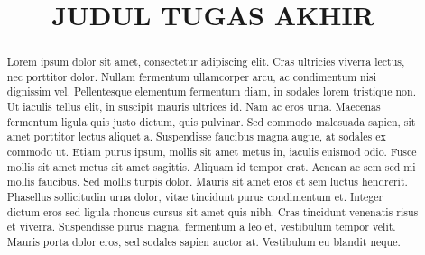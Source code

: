 \documentclass[conference,a4paper,10pt]{IEEEtran}
\begin{document}

\title{JUDUL TUGAS AKHIR}

\author{
    \and
    \and
}

\maketitle

\begin{abstract}
Lorem ipsum dolor sit amet, consectetur adipiscing elit. Cras ultricies viverra
lectus, nec porttitor dolor. Nullam fermentum ullamcorper arcu, ac condimentum
nisi dignissim vel. Pellentesque elementum fermentum diam, in sodales lorem
tristique non. Ut iaculis tellus elit, in suscipit mauris ultrices id. Nam ac
eros urna. Maecenas fermentum ligula quis justo dictum, quis pulvinar. Sed
commodo malesuada sapien, sit amet porttitor lectus aliquet a. Suspendisse
faucibus magna augue, at sodales ex commodo ut. Etiam purus ipsum, mollis sit
amet metus in, iaculis euismod odio. Fusce mollis sit amet metus sit amet
sagittis. Aliquam id tempor erat. Aenean ac sem sed mi mollis faucibus. Sed
mollis turpis dolor. Mauris sit amet eros et sem luctus hendrerit. Phasellus
sollicitudin urna dolor, vitae tincidunt purus condimentum et. Integer dictum
eros sed ligula rhoncus cursus sit amet quis nibh. Cras tincidunt venenatis
risus et viverra. Suspendisse purus magna, fermentum a leo et, vestibulum
tempor velit. Mauris porta dolor eros, sed sodales sapien auctor at. Vestibulum
eu blandit neque.
\end{abstract}
\end{document}
